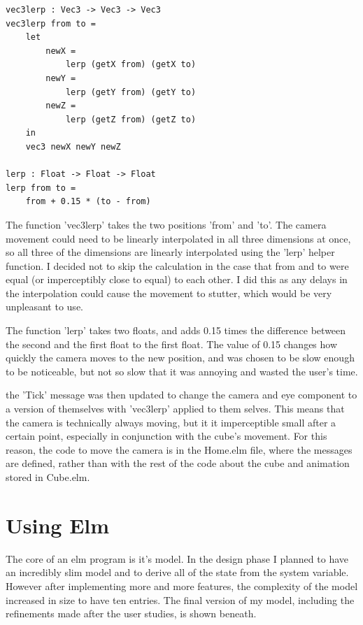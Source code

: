 \documentclass{l4proj}
\begin{document}
\begin{lstlisting}
vec3lerp : Vec3 -> Vec3 -> Vec3
vec3lerp from to =
    let
        newX =
            lerp (getX from) (getX to)
        newY =
            lerp (getY from) (getY to)
        newZ =
            lerp (getZ from) (getZ to)
    in
    vec3 newX newY newZ

lerp : Float -> Float -> Float
lerp from to =
    from + 0.15 * (to - from)
\end{lstlisting}

The function 'vec3lerp' takes the two positions 'from' and 'to'.  The camera movement could need to be linearly interpolated in all three dimensions at once, so all three of the dimensions are linearly interpolated using the 'lerp' helper function.  I decided not to skip the calculation in the case that from and to were equal (or imperceptibly close to equal) to each other.  I did this as any delays in the interpolation could cause the movement to stutter, which would be very unpleasant to use.

The function 'lerp' takes two floats, and adds 0.15 times the difference between the second and the first float to the first float.  The value of 0.15 changes how quickly the camera moves to the new position, and was chosen to be slow enough to be noticeable, but not so slow that it was annoying and wasted the user's time.

the 'Tick' message was then updated to change the camera and eye component to a version of themselves with 'vec3lerp' applied to them selves.  This means that the camera is technically always moving, but it it imperceptible small after a certain point, especially in conjunction with the cube's movement.  For this reason, the code to move the camera is in the Home.elm file, where the messages are defined, rather than with the rest of the code about the cube and animation stored in Cube.elm.

\section{Using Elm}

The core of an elm program is it's model.  In the design phase I planned to have an incredibly slim model and to derive all of the state from the system variable.  However after implementing more and more features, the complexity of the model increased in size to have ten entries.  The final version of my model, including the refinements made after the user studies, is shown beneath.
\end{document}
